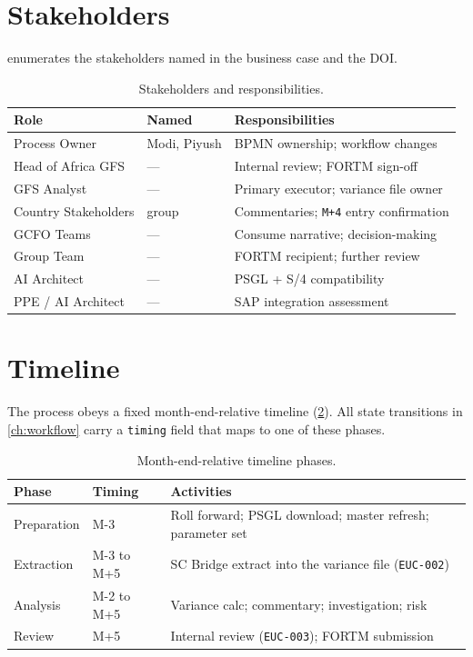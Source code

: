 \section{Stakeholders}

 enumerates the stakeholders named in the
business case and the DOI.

\begin{table}[htbp]
\caption{Stakeholders and responsibilities.}\label{tab:stakeholders}
\centering
\small
\begin{tabularx}{\linewidth}{@{}llX@{}}
\toprule
\textbf{Role} & \textbf{Named} & \textbf{Responsibilities} \\ \midrule
Process Owner             & Modi, Piyush & BPMN ownership; workflow changes \\
Head of Africa GFS        & ---          & Internal review; FORTM sign-off \\
GFS Analyst               & ---          & Primary executor; variance file owner \\
Country Stakeholders      & group        & Commentaries; \texttt{M+4} entry confirmation \\
GCFO Teams                & ---          & Consume narrative; decision-making \\
Group Team                & ---          & FORTM recipient; further review \\
AI Architect              & ---          & PSGL + S/4 compatibility \\
PPE / AI Architect        & ---          & SAP integration assessment \\
\bottomrule
\end{tabularx}
\end{table}

\section{Timeline}

The process obeys a fixed month-end-relative timeline
(\cref{tab:timeline}). All state transitions in \cref{ch:workflow}
carry a \texttt{timing} field that maps to one of these phases.

\begin{table}[htbp]
\caption{Month-end-relative timeline phases.}\label{tab:timeline}
\centering
\small
\begin{tabularx}{\linewidth}{@{}llX@{}}
\toprule
\textbf{Phase} & \textbf{Timing} & \textbf{Activities} \\ \midrule
Preparation & M-3        & Roll forward; PSGL download; master refresh; parameter set \\
Extraction  & M-3 to M+5 & SC Bridge extract into the variance file (\texttt{EUC-002}) \\
Analysis    & M-2 to M+5 & Variance calc; commentary; investigation; risk \\
Review      & M+5        & Internal review (\texttt{EUC-003}); FORTM submission \\
\bottomrule
\end{tabularx}
\end{table}

